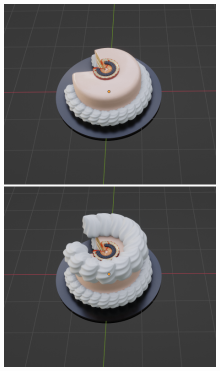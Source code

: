 \begin{figure}[h]
 \begin{minipage}[b]{0.48\linewidth}
  \centering
  \includegraphics[scale=0.25]{./imgs/cakeParamMean/topSizeMin.png}
 \end{minipage}
 \begin{minipage}[b]{0.48\linewidth}
  \centering
  \includegraphics[scale=0.25]{./imgs/cakeParamMean/topSizeMax.png}

\end{minipage}
\end{figure}
